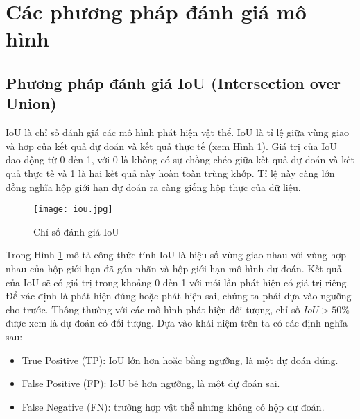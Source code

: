 \documentclass[../the.tex]{subfiles}
\begin{document}


\section{Các phương pháp đánh giá mô hình}

\subsection{Phương pháp đánh giá IoU (Intersection over Union)}

{\fontsize{13}{12} \selectfont

	IoU là chỉ số đánh giá các mô hình phát hiện vật thể. IoU là tỉ lệ giữa vùng giao và hợp của kết quả dự đoán và kết quả thực tế (xem Hình \ref{fig:iou}).
	Giá trị của IoU dao động
	từ 0 đến 1, với 0 là không có sự chồng chéo giữa kết quả dự đoán và kết quả
	thực tế và 1 là hai kết quả này hoàn toàn trùng khớp.
	Tỉ lệ này càng lớn đồng nghĩa hộp giới hạn dự đoán ra càng giống hộp thực của dữ liệu.

}

\begin{figure}[H]
	\centering
	\texttt{[image: iou.jpg]}
	\caption{Chỉ số đánh giá IoU}
	\label{fig:iou}
\end{figure}

{\fontsize{13}{12} \selectfont

Trong Hình \ref{fig:iou} mô tả công thức tính IoU là hiệu số vùng giao nhau với vùng hợp nhau của hộp giới hạn đã gán nhãn và hộp giới hạn mô hình dự đoán.
Kết quả của IoU sẽ có giá trị trong khoảng 0 đến 1 với mỗi lần phát hiện có giá trị riêng. Để xác định là phát hiện đúng hoặc phát hiện sai, chúng ta phải dựa vào ngưỡng cho trước.
Thông thường với các mô hình phát hiện đôi tượng, chỉ số $IoU > 50\%$ được xem là dự đoán có đối tượng. Dựa vào khái niệm trên ta có các định nghĩa sau:

\begin{itemize}
	\item True Positive (TP): IoU lớn hơn hoặc bằng ngưỡng, là một dự đoán đúng.
	\item False Positive (FP): IoU bé hơn ngưỡng, là một dự đoán sai.
	\item False Negative (FN): trường hợp vật thể nhưng không có hộp dự đoán.
\end{itemize}

}
\end{document}
